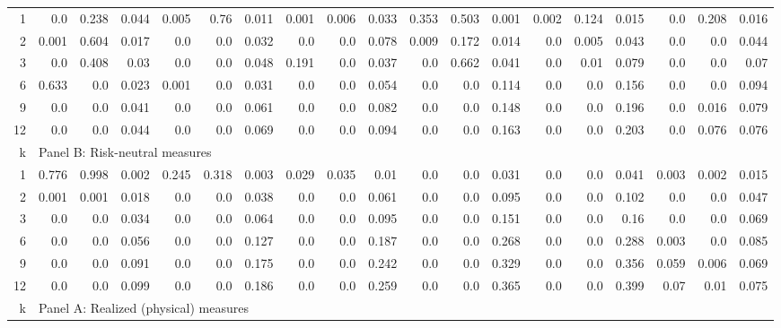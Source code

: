 \begin{landscape}
\begin{table}[h]
\begin{center}
\begin{tabular}{@{\extracolsep{5pt}}rrrrrrrrrrrrrrrrrrr@{}}
1 & 0.0 & 0.238 & 0.044 & 0.005 & 0.76 & 0.011 & 0.001 & 0.006 & 0.033 & 0.353 & 0.503 & 0.001 & 0.002 & 0.124 & 0.015 & 0.0 & 0.208 & 0.016 \\[6pt]
2 & 0.001 & 0.604 & 0.017 & 0.0 & 0.0 & 0.032 & 0.0 & 0.0 & 0.078 & 0.009 & 0.172 & 0.014 & 0.0 & 0.005 & 0.043 & 0.0 & 0.0 & 0.044 \\[6pt]
3 & 0.0 & 0.408 & 0.03 & 0.0 & 0.0 & 0.048 & 0.191 & 0.0 & 0.037 & 0.0 & 0.662 & 0.041 & 0.0 & 0.01 & 0.079 & 0.0 & 0.0 & 0.07 \\[6pt]
6 & 0.633 & 0.0 & 0.023 & 0.001 & 0.0 & 0.031 & 0.0 & 0.0 & 0.054 & 0.0 & 0.0 & 0.114 & 0.0 & 0.0 & 0.156 & 0.0 & 0.0 & 0.094 \\[6pt]
9 & 0.0 & 0.0 & 0.041 & 0.0 & 0.0 & 0.061 & 0.0 & 0.0 & 0.082 & 0.0 & 0.0 & 0.148 & 0.0 & 0.0 & 0.196 & 0.0 & 0.016 & 0.079 \\[6pt]
12 & 0.0 & 0.0 & 0.044 & 0.0 & 0.0 & 0.069 & 0.0 & 0.0 & 0.094 & 0.0 & 0.0 & 0.163 & 0.0 & 0.0 & 0.203 & 0.0 & 0.076 & 0.076 \\[6pt]

\hline

k & \multicolumn{18}{l}{Panel B: Risk-neutral measures} \\[7pt]

\hline

1 & 0.776 & 0.998 & 0.002 & 0.245 & 0.318 & 0.003 & 0.029 & 0.035 & 0.01 & 0.0 & 0.0 & 0.031 & 0.0 & 0.0 & 0.041 & 0.003 & 0.002 & 0.015 \\[6pt]
2 & 0.001 & 0.001 & 0.018 & 0.0 & 0.0 & 0.038 & 0.0 & 0.0 & 0.061 & 0.0 & 0.0 & 0.095 & 0.0 & 0.0 & 0.102 & 0.0 & 0.0 & 0.047 \\[6pt]
3 & 0.0 & 0.0 & 0.034 & 0.0 & 0.0 & 0.064 & 0.0 & 0.0 & 0.095 & 0.0 & 0.0 & 0.151 & 0.0 & 0.0 & 0.16 & 0.0 & 0.0 & 0.069 \\[6pt]
6 & 0.0 & 0.0 & 0.056 & 0.0 & 0.0 & 0.127 & 0.0 & 0.0 & 0.187 & 0.0 & 0.0 & 0.268 & 0.0 & 0.0 & 0.288 & 0.003 & 0.0 & 0.085 \\[6pt]
9 & 0.0 & 0.0 & 0.091 & 0.0 & 0.0 & 0.175 & 0.0 & 0.0 & 0.242 & 0.0 & 0.0 & 0.329 & 0.0 & 0.0 & 0.356 & 0.059 & 0.006 & 0.069 \\[6pt]
12 & 0.0 & 0.0 & 0.099 & 0.0 & 0.0 & 0.186 & 0.0 & 0.0 & 0.259 & 0.0 & 0.0 & 0.365 & 0.0 & 0.0 & 0.399 & 0.07 & 0.01 & 0.075 \\[6pt]

\hline

k & \multicolumn{18}{l}{Panel A: Realized (physical) measures} \\[7pt]


\end{tabular}
\end{center}
\end{table}
\end{landscape}
